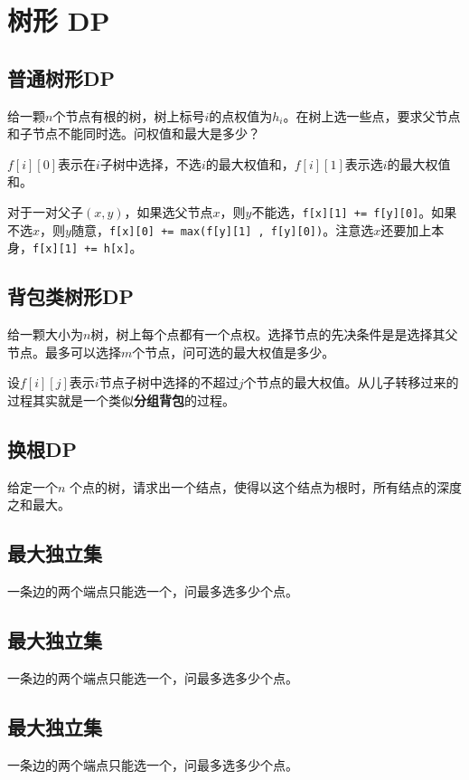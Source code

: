 \section{树形 DP}

\subsection{普通树形DP}

\begin{framed}
    给一颗$n$个节点有根的树，树上标号$i$的点权值为$h_i$。在树上选一些点，要求父节点和子节点不能同时选。问权值和最大是多少？
\end{framed}

$f[i][0]$表示在$i$子树中选择，不选$i$的最大权值和，$f[i][1]$表示选$i$的最大权值和。

对于一对父子$(x,y)$，如果选父节点$x$，则$y$不能选，\verb|f[x][1] += f[y][0]|。如果不选$x$，则$y$随意，\verb|f[x][0] += max(f[y][1] , f[y][0])|。注意选$x$还要加上本身，\verb|f[x][1] += h[x]|。



\subsection{背包类树形DP}

\begin{framed}
    给一颗大小为$n$树，树上每个点都有一个点权。选择节点的先决条件是是选择其父节点。最多可以选择$m$个节点，问可选的最大权值是多少。
\end{framed}

设$f[i][j]$表示$i$节点子树中选择的不超过$j$个节点的最大权值。从儿子转移过来的过程其实就是一个类似\textbf{分组背包}的过程。



\subsection{换根DP}

\begin{framed}
    给定一个$n$ 个点的树，请求出一个结点，使得以这个结点为根时，所有结点的深度之和最大。
\end{framed}



\subsection{最大独立集}
一条边的两个端点只能选一个，问最多选多少个点。


\subsection{最大独立集}
一条边的两个端点只能选一个，问最多选多少个点。


\subsection{最大独立集}
一条边的两个端点只能选一个，问最多选多少个点。

